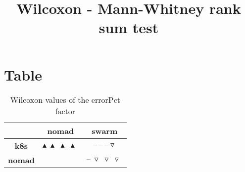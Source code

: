 \documentclass{article}
\title{Wilcoxon - Mann-Whitney rank sum test}
\author{}
\begin{document}
\maketitle
\section{Table}
\begin{table}[!htp]
  \caption{Wilcoxon values of the errorPct factor}
  \label{table:errorPct}
  \centering
  \begin{scriptsize}
  \begin{tabular}{c|cc}
      & \textbf{nomad} & \textbf{swarm} \\\hline
      \textbf{k8s} & $\blacktriangle\ \blacktriangle\ \blacktriangle\ \blacktriangle\  $ & $ \text{--}\ \text{--}\ \text{--}\ \triangledown\ $ \\
      \textbf{nomad} & $ $ & $ \text{--}\ \triangledown\ \triangledown\ \triangledown\ $ \\
  \end{tabular}
  \end{scriptsize}
\end{table}
\end{document}
